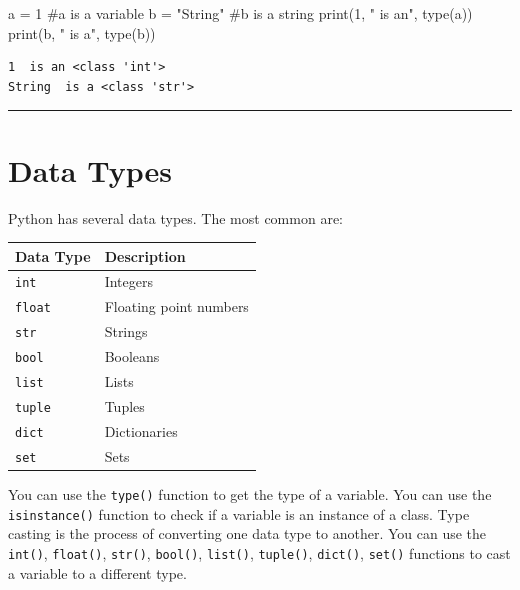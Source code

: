 \documentclass[
  letterpaper,
  DIV=11,
  numbers=noendperiod]{scrreprt}
\newenvironment{Shaded}{\begin{snugshade}}{\end{snugshade}}
\newcommand{\BuiltInTok}[1]{\textcolor[rgb]{0.00,0.23,0.31}{#1}}
\newcommand{\CommentTok}[1]{\textcolor[rgb]{0.37,0.37,0.37}{#1}}
\newcommand{\DecValTok}[1]{\textcolor[rgb]{0.68,0.00,0.00}{#1}}
\newcommand{\NormalTok}[1]{\textcolor[rgb]{0.00,0.23,0.31}{#1}}
\newcommand{\OperatorTok}[1]{\textcolor[rgb]{0.37,0.37,0.37}{#1}}
\newcommand{\StringTok}[1]{\textcolor[rgb]{0.13,0.47,0.30}{#1}}
\begin{document}
\begin{Shaded}
\begin{Highlighting}[]
\NormalTok{a }\OperatorTok{=} \DecValTok{1}  \CommentTok{\#a is a variable}
\NormalTok{b }\OperatorTok{=} \StringTok{"String"} \CommentTok{\#b is a string}
\BuiltInTok{print}\NormalTok{(}\DecValTok{1}\NormalTok{, }\StringTok{" is an"}\NormalTok{, }\BuiltInTok{type}\NormalTok{(a))}
\BuiltInTok{print}\NormalTok{(b, }\StringTok{" is a"}\NormalTok{, }\BuiltInTok{type}\NormalTok{(b))}
\end{Highlighting}
\end{Shaded}

\begin{verbatim}
1  is an <class 'int'>
String  is a <class 'str'>
\end{verbatim}

\begin{center}\rule{0.5\linewidth}{0.5pt}\end{center}

\chapter*{Data Types}\label{data-types}


Python has several data types. The most common are:

\begin{longtable}[]{@{}ll@{}}
\toprule\noalign{}
Data Type & Description \\
\midrule\noalign{}
\endhead
\bottomrule\noalign{}
\endlastfoot
\texttt{int} & Integers \\
\texttt{float} & Floating point numbers \\
\texttt{str} & Strings \\
\texttt{bool} & Booleans \\
\texttt{list} & Lists \\
\texttt{tuple} & Tuples \\
\texttt{dict} & Dictionaries \\
\texttt{set} & Sets \\
\end{longtable}

You can use the \texttt{type()} function to get the type of a variable.
You can use the \texttt{isinstance()} function to check if a variable is
an instance of a class. Type casting is the process of converting one
data type to another. You can use the \texttt{int()}, \texttt{float()},
\texttt{str()}, \texttt{bool()}, \texttt{list()}, \texttt{tuple()},
\texttt{dict()}, \texttt{set()} functions to cast a variable to a
different type.
\end{document}
